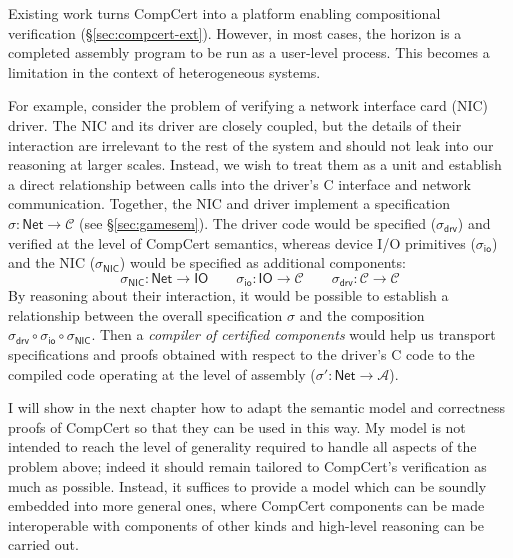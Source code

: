 \documentclass[11pt,oneside]{book}
\theoremstyle{definition}
\newcommand{\kw}[1]{\ensuremath{ \mathsf{#1} }}
\begin{document}
Existing work turns CompCert
into a platform enabling compositional verification
(\S\ref{sec:compcert-ext}).
However, in most cases,
the horizon is a completed assembly program to be run as a user-level process.
This becomes a limitation in the context of heterogeneous systems.

For example,
consider the problem of verifying
a network interface card (NIC) driver.
The NIC and its driver are closely coupled,
but the details of their interaction
are irrelevant to the rest of the system
and should not leak into our reasoning at larger scales.
Instead,
we wish to treat them as a unit
and establish a direct relationship between calls into
the driver's C interface and network communication.
Together, the NIC and driver implement
a specification $\sigma :
\kw{Net} \rightarrow \mathcal{C}$ (see \S\ref{sec:gamesem}). %
The driver code would be specified
($\sigma_\kw{drv}$)
and verified
at the level of CompCert semantics,
whereas device I/O primitives
($\sigma_\kw{io}$)
and the NIC
($\sigma_\kw{NIC}$)
would be specified as additional components:
\[
  \sigma_\kw{NIC} : \kw{Net} \rightarrow \kw{IO}
  \qquad
  \sigma_\kw{io} : \kw{IO} \rightarrow \mathcal{C}
  \qquad
  \sigma_\kw{drv} : \mathcal{C} \rightarrow \mathcal{C}
\]
By reasoning about their interaction,
it would be possible to establish a relationship between
the overall specification $\sigma$ and
the composition
$\sigma_\kw{drv} \circ \sigma_\kw{io} \circ \sigma_\kw{NIC}$.
Then a \emph{compiler of certified components}
would help us transport specifications and proofs
obtained with respect to the driver's C code
to the compiled code operating at the level of assembly
($\sigma' : \kw{Net} \rightarrow \mathcal{A}$).

I will show in the next chapter how to adapt
the semantic model and correctness proofs of CompCert
so that they can be used in this way.
My model is not intended to reach the level of generality
required to handle all aspects of the problem above;
indeed it should remain tailored to CompCert's
verification as much as possible.
Instead, it suffices to provide a model which can be
soundly embedded into more general ones,
where CompCert components can be made interoperable
with components of other kinds
and high-level reasoning can be carried out.
\end{document}
